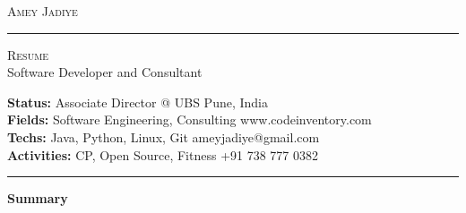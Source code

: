 \documentclass[10pt,A4]{article}
\newcommand{\cvsection}[1]
{
	\begin{center}
		\large\textcolor{sectcol}{\textbf{#1}}
	\end{center}
}
\newcommand{\metasection}[2]
{
\footnotesize{#2} \hspace*{\fill} \footnotesize{#1}\\[1pt]
}
\begin{document}
\pagestyle{fancy}	








\vspace{-8pt}
\begin{center}
	\HUGE \textsc{Amey Jadiye} \textcolor{sectcol}{\rule[-1mm]{1mm}{0.9cm}} \textsc{Resume}\\[2pt]
	\small Software Developer and Consultant
\end{center}



\vspace{6pt}


\metasection{Pune, India}{\textbf{Status:} Associate Director @ UBS}
\metasection{www.codeinventory.com}{\textbf{Fields:} Software Engineering, Consulting} 
\metasection{ameyjadiye@gmail.com}{\textbf{Techs:} Java, Python, Linux, Git}
\metasection{+91 738 777 0382}{\textbf{Activities:} CP, Open Source, Fitness}
\vspace{-2pt}
\textcolor{softcol}{\hrule}
\vspace{6pt}

\normalsize

\vspace{-6pt}
\cvsection{Summary}
\end{document}
